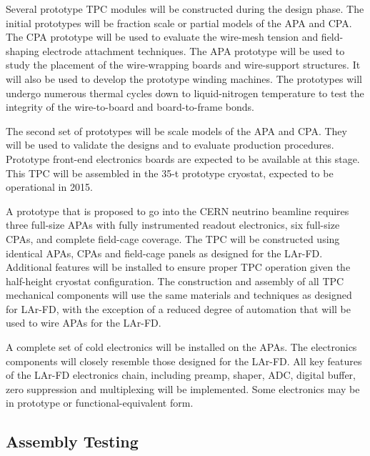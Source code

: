 Several prototype TPC modules will be constructed during the 
design phase.  The initial prototypes will be fraction scale or 
partial models of the APA and CPA.  The CPA prototype will be used 
to evaluate the wire-mesh tension and field-shaping electrode 
attachment techniques.   The APA prototype will be used to study 
the placement of the wire-wrapping boards and wire-support structures.  
It will also be used to develop the prototype winding machines.  
The prototypes will undergo numerous thermal cycles down to 
liquid-nitrogen temperature to test the integrity of the wire-to-board
and board-to-frame bonds.

The second set of prototypes will be scale models of the 
APA and CPA.  They will be used to validate the designs and 
to evaluate production procedures.  Prototype front-end electronics 
boards are expected to be available at this stage.  This TPC will be assembled in the 35-t prototype cryostat, expected to be operational in 2015.

A prototype that is proposed to go into the CERN neutrino beamline requires three full-size APAs with fully instrumented readout electronics, six full-size CPAs, and complete field-cage coverage.  The TPC will be constructed using identical APAs, CPAs and field-cage panels as designed for the LAr-FD.  Additional features will be installed to ensure proper TPC operation given the half-height cryostat configuration. The construction and assembly of all TPC mechanical components will use the same materials and techniques as designed for LAr-FD, with the exception of a reduced degree of automation that will be used to wire APAs for the LAr-FD.

A complete set of cold electronics will be installed on the APAs.  The electronics components will closely resemble those designed for the LAr-FD. All key features of the LAr-FD electronics chain, including preamp, shaper, ADC, digital buffer, zero suppression and multiplexing will be implemented.  Some  electronics  may be in prototype or functional-equivalent form.

\subsection{Assembly Testing}
\label{sec:v5-tpc-checkout-test}

